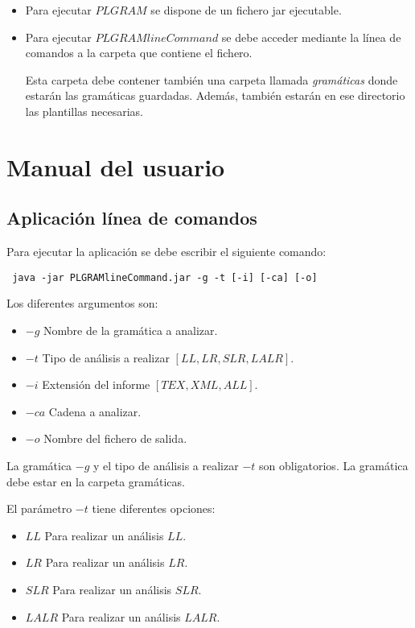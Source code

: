 \begin{itemize}
\item Para ejecutar $PLGRAM$ se dispone de un fichero jar ejecutable.
\item Para ejecutar $PLGRAMlineCommand$ se debe acceder mediante la línea de comandos a la carpeta que contiene el fichero.

Esta carpeta debe contener también una carpeta llamada \textit{gramáticas} donde estarán las gramáticas guardadas. Además, también estarán en ese directorio las plantillas necesarias.

\end{itemize}


\section{Manual del usuario}

\subsection{Aplicación línea de comandos}

Para ejecutar la aplicación se debe escribir el siguiente comando:
\begin{verbatim}
 java -jar PLGRAMlineCommand.jar -g -t [-i] [-ca] [-o] 
\end{verbatim}

 
 Los diferentes argumentos son:
 \begin{itemize}
 	\item $-g$ Nombre de la gramática a analizar.
 	\item $-t$ Tipo de análisis a realizar $[LL,LR,SLR,LALR].$
 	\item $-i$ Extensión del informe $[TEX, XML, ALL]$.
 	\item $-ca$ Cadena a analizar.
 	\item $-o$ Nombre del fichero de salida.
 	
\end{itemize} 



La gramática $-g$ y el tipo de análisis a realizar $-t$ son obligatorios. La gramática debe estar en la carpeta gramáticas.
 
El parámetro $-t$ tiene diferentes opciones:
  \begin{itemize}
 	 \item $LL$ Para realizar un análisis $LL$.
 	 \item $LR$ Para realizar un análisis $LR$.
 	 \item $SLR$ Para realizar un análisis $SLR$.
 	 \item $LALR$ Para realizar un análisis $LALR$.
 \end{itemize}
  
